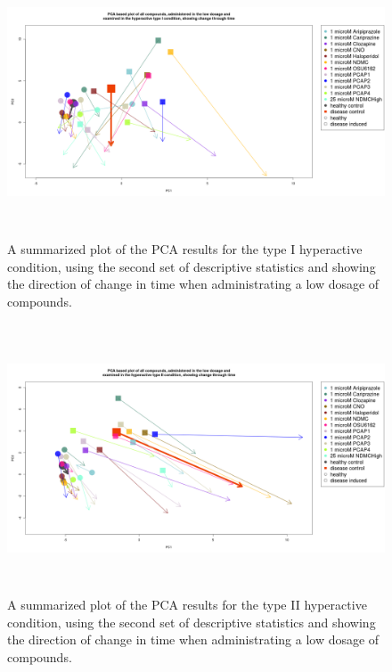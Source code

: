\documentclass[a4paper,12pt]{article}
\begin{document}
\newpage
\begin{figure}[h!]
\begin{center}
\includegraphics[width=16cm,height=8cm]{All_together_1_microM_DarkApoHigh_in_time_set2.png}
\caption{A summarized plot of the PCA results for the type I hyperactive condition, using the second set of descriptive statistics and showing the direction of change in time when administrating a low dosage of compounds.}
\end{center}
\end{figure}
\newpage
\begin{figure}[h!]
\begin{center}
\includegraphics[width=16cm,height=8cm]{All_together_1_microM_DarkPTZ_in_time_set2.png}
\caption{A summarized plot of the PCA results for the type II hyperactive condition, using the second set of descriptive statistics and showing the direction of change in time when administrating a low dosage of compounds.}
\end{center}
\end{figure}
\end{document}

